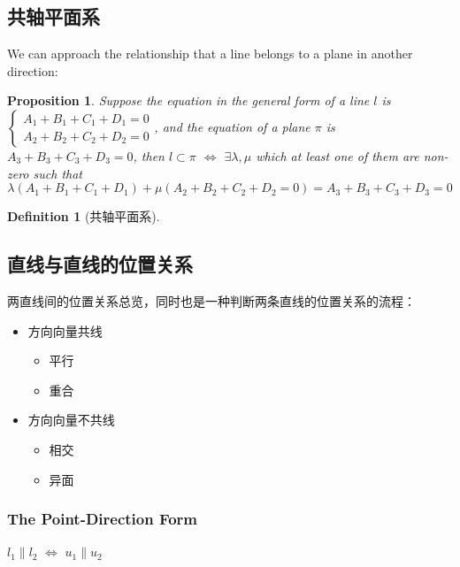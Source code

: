 \documentclass[onecolumn]{ctexart}
\newtheorem{definition}{Definition}
\newtheorem{proposition}{Proposition}
\begin{document}
\subsection{共轴平面系}
We can approach the relationship that a line belongs to a plane in another 
direction:
\begin{proposition}
  Suppose the equation in the general form of a line $l$ is $
  \begin{cases}
    A_1 + B_1 + C_1 + D_1 = 0 \\
    A_2 + B_2 + C_2 + D_2 = 0
  \end{cases}$, and the equation of a plane $\pi$ is $A_3 + B_3 + C_3 + D_3 = 0$, 
  then $l \subset \pi$ $\Leftrightarrow$ $\exists \lambda, \mu$ which at least 
  one of them are non-zero such that
  \begin{equation}
    \lambda (A_1 + B_1 + C_1 + D_1) + \mu (A_2 + B_2 + C_2 + D_2 = 0) = A_3 + B_3 + C_3 + D_3 = 0
  \end{equation}
\end{proposition}

\begin{definition}[共轴平面系]
  
\end{definition}

\subsection{直线与直线的位置关系}
两直线间的位置关系总览，同时也是一种判断两条直线的位置关系的流程：
\begin{itemize}
  \item 方向向量共线
  \begin{itemize}
    \item 平行
    \item 重合
  \end{itemize}
  \item 方向向量不共线
  \begin{itemize}
    \item 相交
    \item 异面
  \end{itemize}
\end{itemize}

\subsubsection{The Point-Direction Form}

$l_1 \parallel l_2$ $\Leftrightarrow$ $u_1 \parallel u_2$
\end{document}
